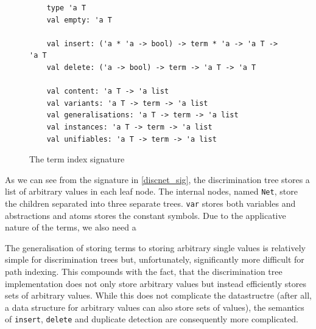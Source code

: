 \begin{figure}[h]
\begin{lstlisting}
    type 'a T
    val empty: 'a T

    val insert: ('a * 'a -> bool) -> term * 'a -> 'a T -> 'a T
    val delete: ('a -> bool) -> term -> 'a T -> 'a T

    val content: 'a T -> 'a list
    val variants: 'a T -> term -> 'a list
    val generalisations: 'a T -> term -> 'a list
    val instances: 'a T -> term -> 'a list
    val unifiables: 'a T -> term -> 'a list
\end{lstlisting}
\caption{The term index signature}
\end{figure} \label{discnet_sig}

As we can see from the signature in \cref{discnet_sig}, the discrimination tree stores a list of arbitrary values in each leaf node. The internal nodes, named \verb!Net!, store the children separated into three separate trees. \verb!var! stores both variables and abstractions and atoms stores the constant symbols. Due to the applicative nature of the terms, we also need a 



The generalisation of storing terms to storing arbitrary single values is relatively simple for discrimination trees but, unfortunately, significantly more difficult for path indexing. This compounds with the fact, that the discrimination tree implementation does not only store arbitrary values but instead efficiently stores sets of arbitrary values. While this does not complicate the datastructre (after all, a data structure for arbitrary values can also store sets of values), the semantics of \verb!insert!, \verb!delete! and duplicate detection are consequently more complicated.

